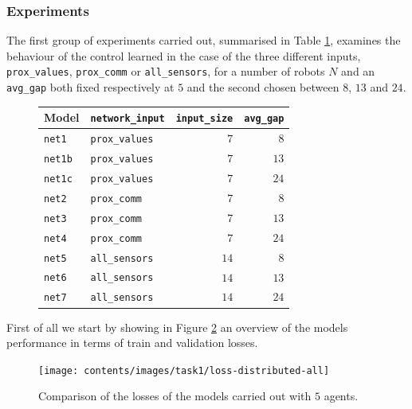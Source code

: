 \subsubsection{Experiments}
\label{subsubsec:expdist}

The first group of experiments carried out, summarised in Table 
\ref{tab:modeln5dist}, examines the behaviour of the control learned in the case 
of the three different inputs, \texttt{prox\_values}, \texttt{prox\_comm} or 
\texttt{all\_sensors}, for a number of robots $N$ and an \texttt{avg\_gap} both 
fixed respectively at $5$ and the second chosen between $8$, $13$ and $24$.
\begin{figure}[H]
	\centering
	\begin{tabular}{llrr}
		\toprule
		\textbf{Model} \quad & \textbf{\texttt{network\_input}} & 
		\textbf{\texttt{input\_size}} &
		\textbf{\texttt{avg\_gap}} \\
		\midrule
		\texttt{net1} 				 & \texttt{prox\_values}	&  $  7$  &  $  8$  \\
		\texttt{net1b} 				& \texttt{prox\_values}	   &  $  7$  &  $13$ \\
		\texttt{net1c} 				& \texttt{prox\_values}	   &  $  7$  &  $24$  \\
		\texttt{net2} 				 & \texttt{prox\_comm}	  &  $  7$  &  $  8$  \\
		\texttt{net3} 				 & \texttt{prox\_comm}	  &  $  7$  &  $13$  \\
		\texttt{net4} 				 & \texttt{prox\_comm}	  &  $  7$  &  $24$  \\
		\texttt{net5} 				 & \texttt{all\_sensors}	  &  $14$  &  $  8$  \\
		\texttt{net6} 				 & \texttt{all\_sensors}	  &  $14$  &  $13$ 	\\
		\texttt{net7} 				 & \texttt{all\_sensors}	  &  $14$  &  $24$ 	\\
		\bottomrule
	\end{tabular}
	\label{tab:modeln5dist}
\end{figure}

First of all we start by showing in Figure \ref{fig:distloss} an overview of the 
models performance in terms of train and validation losses. 
\begin{figure}[!htb]
	\centering
	\texttt{[image: contents/images/task1/loss-distributed-all]}%
	\caption{Comparison of the losses of the models carried out with $5$ agents.}
	\label{fig:distloss}
\end{figure}

